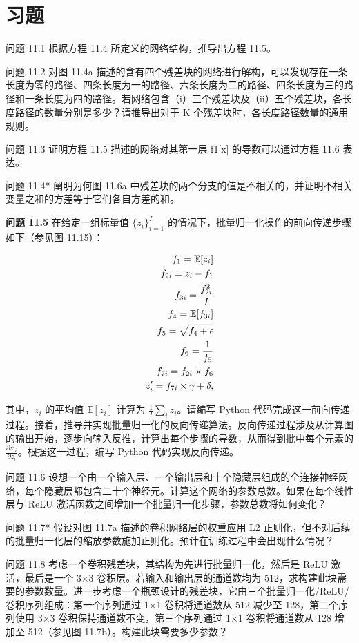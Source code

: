 \documentclass[lang=cn,newtx,10pt,scheme=chinese]{elegantbook}
\begin{document}
\section{习题}  
问题 11.1 根据方程 11.4 所定义的网络结构，推导出方程 11.5。

问题 11.2 对图 11.4a 描述的含有四个残差块的网络进行解构，可以发现存在一条长度为零的路径、四条长度为一的路径、六条长度为二的路径、四条长度为三的路径和一条长度为四的路径。若网络包含（i）三个残差块及（ii）五个残差块，各长度路径的数量分别是多少？请推导出对于 K 个残差块时，各长度路径数量的通用规则。

问题 11.3 证明方程 11.5 描述的网络对其第一层 f1[x] 的导数可以通过方程 11.6 表达。

问题 11.4* 阐明为何图 11.6a 中残差块的两个分支的值是不相关的，并证明不相关变量之和的方差等于它们各自方差的和。

\textbf{问题 11.5} 在给定一组标量值 \(\{z_i\}_{i=1}^I\) 的情况下，批量归一化操作的前向传递步骤如下（参见图 11.15）：

\begin{align}
f_1 = \mathbb{E}[z_i] \notag \\
f_{2i} = z_i - f_1 \notag \\
f_{3i} = \frac{f_{2i}^2}{I} \notag \\
f_4 = \mathbb{E}[f_{3i}] \notag \\
f_5 = \sqrt{f_4 + \epsilon} \notag \\
f_6 = \frac{1}{f_5} \notag \\
f_{7i} = f_{2i} \times f_6 \notag \\
z'_i = f_{7i} \times \gamma + \delta, 
\end{align} 


其中，\(z_i\) 的平均值 \(\mathbb{E}[z_i]\) 计算为 \(\frac{1}{I} \sum_{i} z_i\)。请编写 Python 代码完成这一前向传递过程。接着，推导并实现批量归一化的反向传递算法。反向传递过程涉及从计算图的输出开始，逐步向输入反推，计算出每个步骤的导数，从而得到批中每个元素的 \(\frac{\partial z'_i}{\partial z_i}\)。根据这一过程，编写 Python 代码实现反向传递。

问题 11.6 设想一个由一个输入层、一个输出层和十个隐藏层组成的全连接神经网络，每个隐藏层都包含二十个神经元。计算这个网络的参数总数。如果在每个线性层与 ReLU 激活函数之间增加一个批量归一化步骤，参数总数将如何变化？

问题 11.7* 假设对图 11.7a 描述的卷积网络层的权重应用 L2 正则化，但不对后续的批量归一化层的缩放参数施加正则化。预计在训练过程中会出现什么情况？

问题 11.8 考虑一个卷积残差块，其结构为先进行批量归一化，然后是 ReLU 激活，最后是一个 3×3 卷积层。若输入和输出层的通道数均为 512，求构建此块需要的参数数量。进一步考虑一个瓶颈设计的残差块，它由三个批量归一化/ReLU/卷积序列组成：第一个序列通过 1×1 卷积将通道数从 512 减少至 128，第二个序列使用 3×3 卷积保持通道数不变，第三个序列通过 1×1 卷积将通道数从 128 增加至 512（参见图 11.7b）。构建此块需要多少参数？
\end{document}
